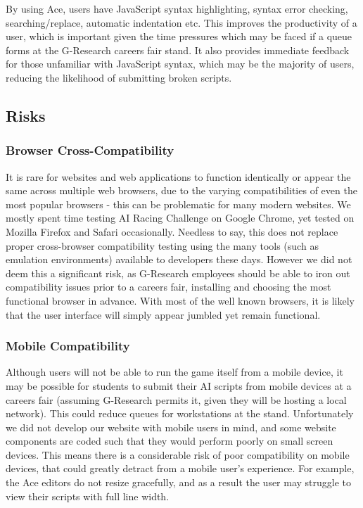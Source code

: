 \noindent By using Ace, users have JavaScript syntax highlighting, syntax error checking, searching/replace, automatic indentation etc. This improves the productivity of a user, which is important given the time pressures which may be faced if a queue forms at the G-Research careers fair stand. It also provides immediate feedback for those unfamiliar with JavaScript syntax, which may be the majority of users, reducing the likelihood of submitting broken scripts.

\subsection{Risks}

\subsubsection{Browser Cross-Compatibility}

It is rare for websites and web applications to function identically or appear the same across multiple web browsers, due to the varying compatibilities of even the most popular browsers - this can be problematic for many modern websites. We mostly spent time testing AI Racing Challenge on Google Chrome, yet tested on Mozilla Firefox and Safari occasionally. Needless to say, this does not replace proper cross-browser compatibility testing using the many tools (such as emulation environments) available to developers these days. However we did not deem this a significant risk, as G-Research employees should be able to iron out compatibility issues prior to a careers fair, installing and choosing the most functional browser in advance. With most of the well known browsers, it is likely that the user interface will simply appear jumbled yet remain functional.

\subsubsection{Mobile Compatibility}

Although users will not be able to run the game itself from a mobile device, it may be possible for students to submit their AI scripts from mobile devices at a careers fair (assuming G-Research permits it, given they will be hosting a local network). This could reduce queues for workstations at the stand. Unfortunately we did not develop our website with mobile users in mind, and some website components are coded such that they would perform poorly on small screen devices. This means there is a considerable risk of poor compatibility on mobile devices, that could greatly detract from a mobile user's experience. For example, the Ace editors do not resize gracefully, and as a result the user may struggle to view their scripts with full line width.

